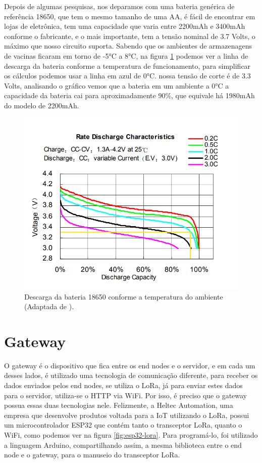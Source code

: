 Depois de algumas pesquisas, nos deparamos com uma bateria genérica de referência 18650, que tem o mesmo tamanho de uma AA, é fácil de encontrar em lojas de eletrônica, tem uma capacidade que varia entre 2200mAh e 3400mAh conforme o fabricante, e o mais importante, tem a tensão nominal de 3.7 Volts, o máximo que nosso circuito suporta. Sabendo que os ambientes de armazenagens de vacinas ficaram em torno de -5°C a 8°C, na figura \ref{fig:battery-discharge} podemos ver a linha de descarga da bateria conforme a temperatura de funcionamento, para simplificar os cálculos podemos usar a linha em azul de 0°C. nossa tensão de corte é de 3.3 Volts, analisando o gráfico vemos que a bateria em um ambiente a 0°C a capacidade da bateria cai para aproximadamente 90\%, que equivale há 1980mAh do modelo de 2200mAh.

\begin{figure}[H]
  \centering
  \includegraphics[width=.80\textwidth]{assets/18650-discharge.png} 
  \caption{Descarga da bateria 18650 conforme a temperatura do ambiente (Adaptada de \cite{EEMB201018650}).}
  \label{fig:battery-discharge} 
\end{figure}

\section{Gateway}
\label{metod:gateway}
O gateway é o dispositivo que fica entre os end nodes e o servidor, e em cada um desses lados, é utilizado uma tecnologia de comunicação diferente, para receber os dados enviados pelos end nodes, se utiliza o LoRa, já para enviar estes dados para o servidor, utiliza-se o HTTP via WiFi. Por isso, é preciso que o gateway possua essas duas tecnologias nele. Felizmente, a Heltec Automation, uma empresa que desenvolve produtos voltada para a IoT utilizando o LoRa, possui um microcontrolador ESP32 que contém tanto o transceptor LoRa, quanto o WiFi, como podemos ver na figura \ref{fig:esp32-lora}. Para programá-lo, foi utilizado a linguagem Arduino, compartilhando assim, a mesma biblioteca entre o end node e o gateway, para o manuseio do transceptor LoRa.


